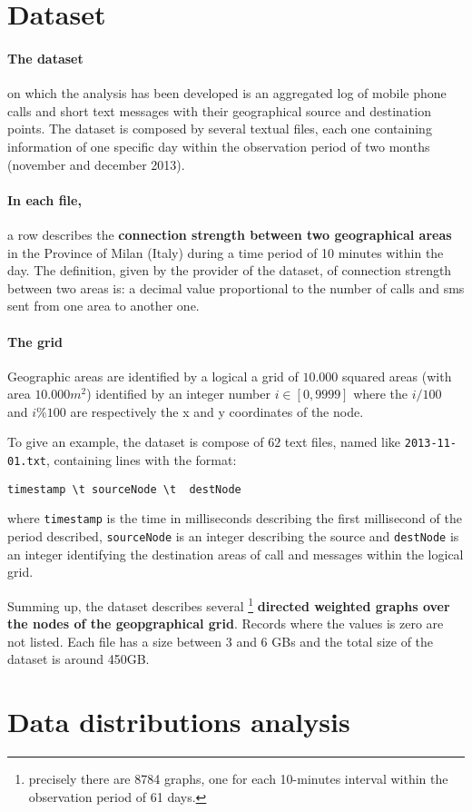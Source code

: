 \section{Dataset}
\label{thedataset}

\paragraph{The dataset} on which the analysis has been developed is an aggregated log of mobile phone
calls and short text messages with their geographical source and destination points.
The dataset is composed by several textual files, each one containing information of one specific day
within the observation period of two months (november and december 2013).

\paragraph{In each file,} a row describes the \textbf{connection strength between two geographical areas} in the Province of Milan (Italy) during a time period of 10 minutes within the day.
The definition, given by the provider of the dataset, of connection strength between two areas is: a decimal value proportional to the number of calls and sms sent from one area to another one.

\paragraph{The grid} Geographic areas are identified by a logical a grid of $10.000$ squared areas (with area $10.000m^2$)
identified by an integer number $i \in [0, 9999]$ where the
$ i / 100 $ and $ i \% 100 $ are respectively the  
x and y coordinates of the node.

To give an example, the dataset is compose of $62$ text files, named like \verb!2013-11-01.txt!, containing lines with the format:

\begin{verbatim}
timestamp \t sourceNode	\t 	destNode
\end{verbatim}

where \verb!timestamp! is the time in milliseconds describing the first millisecond of the period described, \verb!sourceNode! is an integer describing the source and \verb!destNode! is an integer identifying the destination areas of call and messages within the logical grid.

Summing up, the dataset describes several \footnote{precisely there are 8784 graphs, one for each 10-minutes interval within the observation period of 61 days.} \textbf{directed weighted graphs over
the nodes of the geopgraphical grid}.
Records where the values is zero are not listed. Each file has a size between
3 and 6 GBs and the total size of the dataset is around 450GB.

\section{Data distributions analysis}
\label{ds_analysis}


